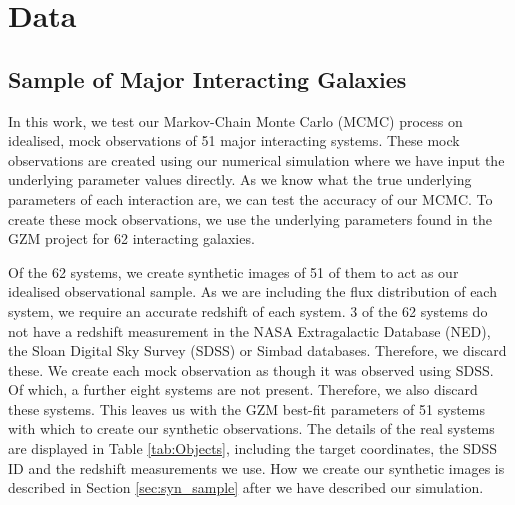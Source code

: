 \vspace{-5mm}
\section{Data}\label{Data}
\subsection{Sample of Major Interacting Galaxies}
\noindent In this work, we test our Markov-Chain Monte Carlo (MCMC) process on idealised, mock observations of 51 major interacting systems. These mock observations are created using our numerical simulation where we have input the underlying parameter values directly. As we know what the true underlying parameters of each interaction are, we can test the accuracy of our MCMC. To create these mock observations, we use the underlying parameters found in the GZM project for 62 interacting galaxies.

Of the 62 systems, we create synthetic images of 51 of them to act as our idealised observational sample. As we are including the flux distribution of each system, we require an accurate redshift of each system. 3 of the 62 systems do not have a redshift measurement in the NASA Extragalactic Database (NED), the Sloan Digital Sky Survey (SDSS) or Simbad databases. Therefore, we discard these. We create each mock observation as though it was observed using SDSS. Of which, a further eight systems are not present. Therefore, we also discard these systems. This leaves us with the GZM best-fit parameters of 51 systems with which to create our synthetic observations. The details of the real systems are displayed in Table \ref{tab:Objects}, including the target coordinates, the SDSS ID and the redshift measurements we use. How we create our synthetic images is described in Section \ref{sec:syn_sample} after we have described our simulation.

